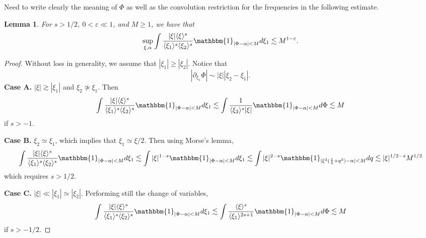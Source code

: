 \documentclass[a4paper, 11pt]{amsart}
\newcommand{\jap}[1]{\langle #1 \rangle}
\newcommand{\fia}{\mathbbm{1}_{|\Phi-\alpha|<M}}
\theoremstyle{plain}
\newtheorem{lem}[thm]{Lemma}
\theoremstyle{definition}
\theoremstyle{remark}
\newcommand{\5}{\text{V}}
\newcommand{\eps}{\varepsilon}
\numberwithin{equation}{section}
\theoremstyle{mytheoremstyle} \newtheorem{nota}[thm]{Remark}
\theoremstyle{mytheoremstyle} \newtheorem{exemplo}[thm]{Example}
\newcommand{\red}{\color{red}}
\newcommand{\blue}{\color{blue}}
\begin{document}
{\red
Need to write clearly the meaning of $\Phi$ as well as the convolution restriction for the frequencies in the following estimate.


}

\begin{lem}\label{lem:bilin}
\blue
For $s>1/2$, $0<\eps\ll1$, and $M\ge 1$, we have that
\begin{equation}
    \sup_{\xi,\alpha} \int \frac{|\xi|\jap{\xi}^s}{\jap{\xi_1}^s\jap{\xi_2}^s} \fia d\xi_1 \lesssim M^{1-\eps}.
\end{equation}
\end{lem}
\begin{proof}
\blue
Without loss in generality, we assume that $|\xi_1|\ge |\xi_2|$. Notice that
$$
|\partial_{\xi_1} \Phi | \sim |\xi||\xi_2-\xi_1|.
$$
\textbf{Case A.} $|\xi| \gtrsim |\xi_1|$ and $\xi_2\not\simeq \xi_1$. Then
$$
\int \frac{|\xi|\jap{\xi}^s}{\jap{\xi_1}^s\jap{\xi_2}^s} \fia d\xi_1 \lesssim \int \frac{1}{\jap{\xi_2}^s |\xi|}\fia d\Phi \lesssim M
$$
if $s>-1$.

\noindent\textbf{Case B.} $\xi_2\simeq \xi_1$, which implies that $\xi_1\simeq \xi/2$. Then using Morse's lemma,
$$
\int \frac{|\xi|\jap{\xi}^s}{\jap{\xi_1}^s\jap{\xi_2}
^s} \fia d\xi_1 \lesssim \int |\xi|^{1-s}\fia d\xi_1 \lesssim \int |\xi|^{2-s}\mathbbm{1}_{|\xi^3(\frac{1}{4}+q^2)-\alpha|<M} dq\lesssim |\xi|^{1/2-s}M^{1/2} $$
which requires $s>1/2$.

\noindent\textbf{Case C.} $|\xi|\ll |\xi_1|\simeq |\xi_2|$. Performing still the change of variables,
$$
\int \frac{|\xi|\jap{\xi}^s}{\jap{\xi_1}^s\jap{\xi_2}^s} \fia d\xi_1 \lesssim \int \frac{\jap{\xi}^s}{\jap{\xi_1}^{2s+1} }\fia d\Phi \lesssim M
$$
if $s>-1/2$.
\end{proof}
\end{document}
